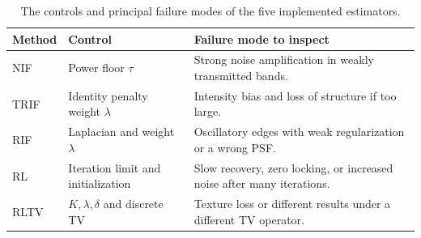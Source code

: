 \begin{table}[!htbp]
\centering
\caption{The controls and principal failure modes of the five implemented estimators.}
\small
\begin{tabularx}{\linewidth}{@{}lYY@{}}
\toprule Method & Control & Failure mode to inspect\\\midrule
NIF & Power floor \(\tau\) & Strong noise amplification in weakly transmitted bands.\\
TRIF & Identity penalty weight \(\lambda\) & Intensity bias and loss of structure if too large.\\
RIF & Laplacian and weight \(\lambda\) & Oscillatory edges with weak regularization or a wrong PSF.\\
RL & Iteration limit and initialization & Slow recovery, zero locking, or increased noise after many iterations.\\
RLTV & \(K,\lambda,\delta\) and discrete TV & Texture loss or different results under a different TV operator.\\
\bottomrule
\end{tabularx}
\end{table}
